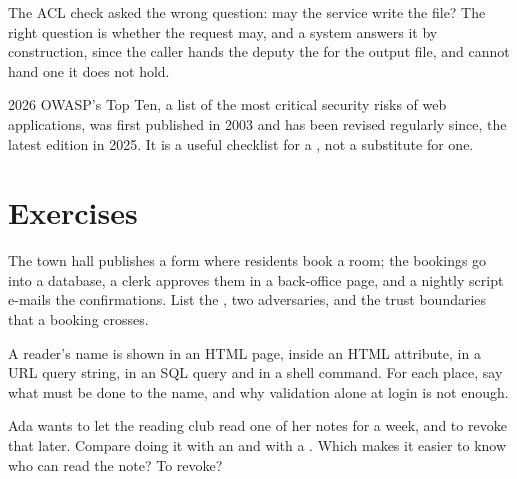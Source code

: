 \label{out:b3:software-security:acl}

The ACL check asked the wrong question: may the service write the file? The right question is whether the request may, and a  system answers it by construction, since the caller hands the deputy the  for the output file, and cannot hand one it does not hold.

\begin{dated}{2026}
OWASP's Top Ten, a list of the most critical security risks of web applications, was first published in 2003 and has been revised regularly since, the latest edition in 2025. It is a useful checklist for a , not a substitute for one. %
\end{dated}

\section{Exercises}\label{sec:b3:software-security:exercises}

\begin{exercise}[$\star$]\label{exo:b3:software-security:1}
The town hall publishes a form where residents book a room; the bookings go into a database, a clerk approves them in a back-office page, and a nightly script e-mails the confirmations. List the , two adversaries, and the trust boundaries that a booking crosses.
\end{exercise}

\begin{exercise}[$\star$]\label{exo:b3:software-security:2}
A reader's name is shown in an HTML page, inside an HTML attribute, in a URL query string, in an SQL query and in a shell command. For each place, say what must be done to the name, and why validation alone at login is not enough.
\end{exercise}

\begin{exercise}[$\star$]\label{exo:b3:software-security:3}
Ada wants to let the reading club read one of her notes for a week, and to revoke that later. Compare doing it with an  and with a . Which makes it easier to know who can read the note? To revoke?
\end{exercise}


